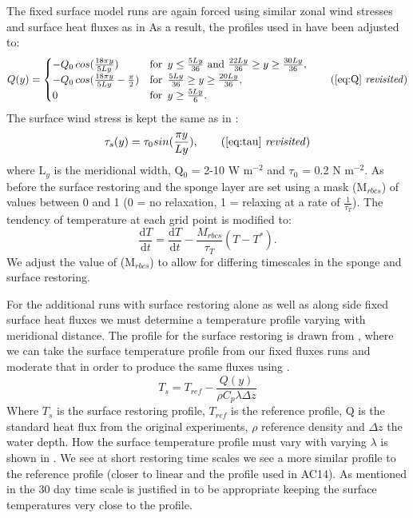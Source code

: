 The fixed surface model runs are again forced using similar zonal wind stresses and surface heat fluxes as in \citet{Abernathey2011} As a result, the profiles used in \citet{Abernathey2011} have been adjusted to:
\begin{equation*}
Q(y)=
\begin{cases}
-Q_{0}\,cos(\frac{18\pi y}{5Ly}) & \text{for }\, y \le \frac{5Ly}{36} \text{ and } \frac{22Ly}{36} \geq y \geq \frac{30Ly}{36},\\
-Q_{0}\,cos(\frac{18 \pi y}{5Ly}-\frac{\pi}{2}) & \text{for }\, \frac{5Ly}{36} \geq y \geq \frac{20Ly}{36},\\
0 & \text{for }\, y \geq \frac{5Ly}{6}.
\end{cases}
\tag{\ref{eq:Q} \textit{revisited}}
\end{equation*}
The surface wind stress is kept the same as in \cite{Abernathey2011}:
\begin{equation*}
\tau_s(y)=\tau_0 sin(\frac{\pi y}{Ly}),
\tag{\ref{eq:tau} \textit{revisited}}
\end{equation*}
where L$_y$ is the meridional width, Q$_0$ = 2-10 W m$^{-2}$ and $\tau_0$ = 0.2 N m$^{-2}$. As before the surface restoring and the sponge layer are set using a mask (M$_{rbcs}$) of values between 0 and 1 (0 = no relaxation, 1 = relaxing at a rate of $ \displaystyle{\frac{1}{\tau_{T}}}$). The tendency of temperature at each grid point is modified to:
\begin{equation*}
\frac{\mathrm{d}T}{\mathrm{d}t}=\frac{\mathrm{d}T}{\mathrm{d}t}-\frac{M_{rbcs}}{\tau_{T}}(T-T^*).
\end{equation*}
We adjust the value of (M$_{rbcs}$) to allow for differing timescales in the sponge and surface restoring. 

For the additional runs with surface restoring alone as well as along side fixed surface heat fluxes we must determine a temperature profile varying with meridional distance. The profile for the surface restoring is drawn from \citet{Zhai2014}, where we can take the surface temperature profile from our fixed fluxes runs and moderate that in order to produce the same fluxes using .
\begin{equation}
T_{s} = T_{ref} - \frac{Q(y)}{\rho C_p \lambda \Delta z}
\label{eq:Ts}
\end{equation}
Where $T_s $ is the surface restoring profile, $T_{ref}$ is the reference profile, Q is the standard heat flux from the original experiments, $ \rho $ reference density and $\Delta z$ the water depth. How the surface temperature profile must vary with varying $\lambda $ is shown in . We see at short restoring time scales we see a more similar profile to the reference profile  (closer to linear and the profile used in AC14). As mentioned in the 30 day time scale is justified in \cite{Hanley1971} to be appropriate keeping the surface temperatures very close to the profile.
 
